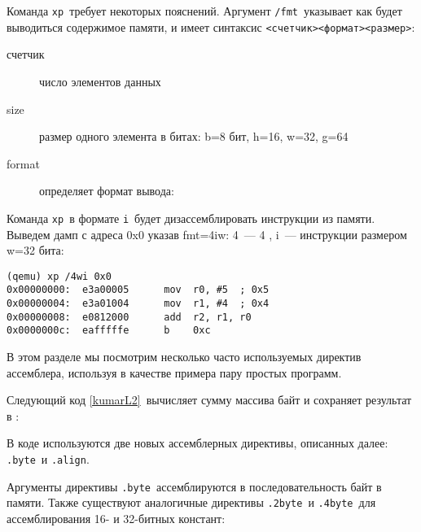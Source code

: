 Команда \verb|xp|\ требует некоторых пояснений. Аргумент \verb|/fmt|\ указывает
как будет выводиться содержимое памяти, и имеет синтаксис
\verb|<счетчик><формат><размер>|:

\begin{description}
\item[счетчик] число элементов данных
\item[size] размер одного элемента в битах: b=8 бит, h=16, w=32, g=64
\item[format] определяет формат вывода:
\end{description}

Команда \verb|xp|\ в формате \verb|i|\ будет дизассемблировать инструкции из
памяти. Выведем дамп с адреса 0x0 указав fmt=4iw: 4\ --- 4 , i\ ---
инструкции размером w=32 бита:

\begin{verbatim}
(qemu) xp /4wi 0x0
0x00000000:  e3a00005      mov  r0, #5  ; 0x5
0x00000004:  e3a01004      mov  r1, #4  ; 0x4
0x00000008:  e0812000      add  r2, r1, r0
0x0000000c:  eafffffe      b    0xc
\end{verbatim}

\secup
{}\secdown

В этом разделе мы посмотрим несколько часто используемых директив ассемблера,
используя в качестве примера пару простых программ.

\secdown

Следующий код \ref{kumarL2}\ вычисляет сумму массива байт и сохраняет результат
в :

\label{kumarL2}

В коде используются две новых ассемблерных директивы, описанных далее:
\verb|.byte|\ и \verb|.align|.


Аргументы директивы \verb|.byte|\ ассемблируются в последовательность байт в
памяти. Также существуют аналогичные директивы \verb|.2byte|\ и \verb|.4byte|\
для ассемблирования 16- и 32-битных констант:

